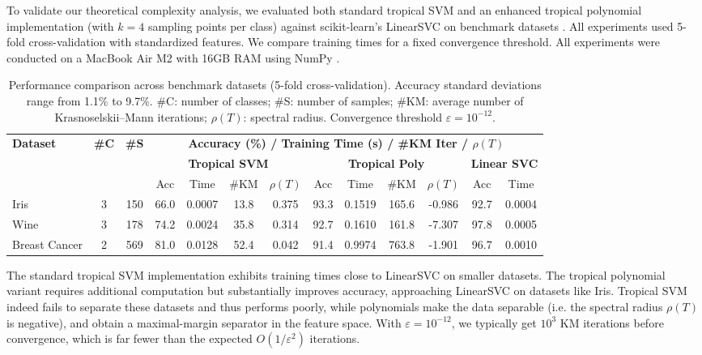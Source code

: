 \documentclass{article}
\begin{document}
To validate our theoretical complexity analysis, we evaluated both standard tropical SVM and an enhanced tropical polynomial implementation (with $k=4$ sampling points per class) against scikit-learn's LinearSVC on benchmark datasets \cite{scikit-learn}. All experiments used 5-fold cross-validation with standardized features. We compare training times for a fixed convergence threshold. All experiments were conducted on a MacBook Air M2 with 16GB RAM using NumPy \cite{harris2020array}.

\begin{table}[h]
    \centering
    \footnotesize
    \begin{tabular}{@{}l@{\hskip 4pt}c@{\hskip 4pt}c@{\hskip 8pt}ccc@{\hskip 4pt}c@{\hskip 8pt}cccc@{\hskip 8pt}cc@{}}
    \toprule
    \multirow{3}{*}{\textbf{Dataset}} & \multirow{3}{*}{\textbf{\#C}} & \multirow{3}{*}{\textbf{\#S}} & \multicolumn{10}{c}{\textbf{Accuracy (\%) / Training Time (s) / \#KM Iter / $\rho(T)$}} \\
    \cmidrule(lr){4-13}
    & & & \multicolumn{4}{c}{\textbf{Tropical SVM}} & \multicolumn{4}{c}{\textbf{Tropical Poly}} & \multicolumn{2}{c}{\textbf{Linear SVC}} \\
    \cmidrule(lr){4-7} \cmidrule(lr){8-11} \cmidrule(lr){12-13}
    & & & Acc & Time & \#KM & $\rho(T)$ & Acc & Time & \#KM & $\rho(T)$ & Acc & Time \\
    \midrule
    Iris & 3 & 150 & 66.0 & 0.0007 & 13.8 & 0.375 & 93.3 & 0.1519 & 165.6 & -0.986 & 92.7 & 0.0004 \\
    Wine & 3 & 178 & 74.2 & 0.0024 & 35.8 & 0.314 & 92.7 & 0.1610 & 161.8 & -7.307 & 97.8 & 0.0005 \\
    Breast Cancer & 2 & 569 & 81.0 & 0.0128 & 52.4 & 0.042 & 91.4 & 0.9974 & 763.8 & -1.901 & 96.7 & 0.0010 \\
    \bottomrule
    \end{tabular}
    \vspace{0.5em}
    \caption{Performance comparison across benchmark datasets (5-fold cross-validation). Accuracy standard deviations range from 1.1\% to 9.7\%. \#C: number of classes; \#S: number of samples; \#KM: average number of Krasnoselskii--Mann iterations; $\rho(T)$: spectral radius. Convergence threshold $\varepsilon = 10^{-12}$.}
    \label{tab:benchmark_results}
\end{table}


The standard tropical SVM implementation exhibits training times close to LinearSVC on smaller datasets. The tropical polynomial variant requires additional computation but substantially improves accuracy, approaching LinearSVC on datasets like Iris.
Tropical SVM indeed fails to separate these datasets and thus performs poorly, while polynomials make the data separable (i.e. the spectral radius $\rho(T)$ is negative), and obtain a maximal-margin separator in the feature space.
With $\varepsilon = 10^{-12}$, we typically get $10^3$ KM iterations before convergence, which is far fewer than the expected $O(1/\varepsilon^2)$ iterations.
\end{document}
